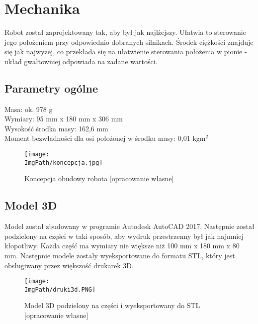 \documentclass[a4paper,12pt,twoside,openany]{report}
\newcommand{\ImgPath}{.}
\begin{document}
\chapter{Mechanika}
Robot został zaprojektowany tak, aby był jak najlżejszy. Ułatwia to sterowanie jego położeniem przy odpowiednio dobranych silnikach. Środek ciężkości znajduje się jak najwyżej, co przekłada się na ułatwienie sterowania położenia w pionie - układ gwałtowniej odpowiada na zadane wartości.

\section{Parametry ogólne}

\noindent Masa: ok. 978 g\\
Wymiary: 95 mm x 180 mm x 306 mm\\
Wysokość środka masy: 162,6 mm\\
Moment bezwładności dla osi położonej w środku masy: 0,01 kgm$^2$\\

\begin{figure}[!htbp]
	\begin{center}
\centering
\texttt{[image: \\ImgPath/koncepcja.jpg]}
\end{center}
	\caption{Koncepcja obudowy robota [opracowanie własne]}
	\label{model3d}
\end{figure}

\newpage
\section{Model 3D}
Model został zbudowany w programie Autodesk AutoCAD 2017. Następnie został podzielony na części w taki sposób, aby wydruk przestrzenny był jak najmniej kłopotliwy. Każda część ma wymiary nie większe niż 100 mm x 180 mm x 80 mm. Następnie modele zostały wyeksportowane do formatu STL, który jest obsługiwany przez większość drukarek 3D.

\begin{figure}[!htbp]
	\begin{center}
\centering
\texttt{[image: \\ImgPath/druki3d.PNG]}
\end{center}
	\caption{Model 3D podzielony na części i wyeksportowany do STL [opracowanie własne]}
	\label{druki3d}
\end{figure}
\end{document}
